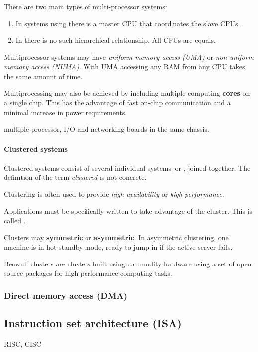 There are two main types of multi-processor systems:
\begin{enumerate}
\item In systems using  there is a master CPU that coordinates the slave CPUs.
\item In  there is no such hierarchical relationship. All CPUs are equals.
\end{enumerate}

Multiprocessor systems may have \textit{uniform memory access (UMA)} or \textit{non-uniform memory access (NUMA)}. With UMA accessing any RAM from any CPU takes the same amount of time.

Multiprocessing may also be achieved by including multiple computing \textbf{cores} on a single chip. This has the advantage of fast on-chip communication and a minimal increase in power requirements.

 multiple processor, I/O and networking boards in the same chassis.

\paragraph{Clustered systems}
Clustered systems consist of several individual systems, or , joined together. The definition of the term \textit{clustered} is not concrete.

Clustering is often used to provide \textit{high-availability} or \textit{high-performance}.

Applications must be specifically written to take advantage of the cluster. This is called .

Clusters may \textbf{symmetric} or \textbf{asymmetric}. In asymmetric clustering, one machine is in hot-standby mode, ready to jump in if the active server fails.


\begin{example}
Beowulf clusters are clusters built using commodity hardware using a set of open source packages for high-performance computing tasks.
\end{example}
\subsubsection{Direct memory access (DMA)}
\subsection{Instruction set architecture (ISA)}
RISC, CISC
